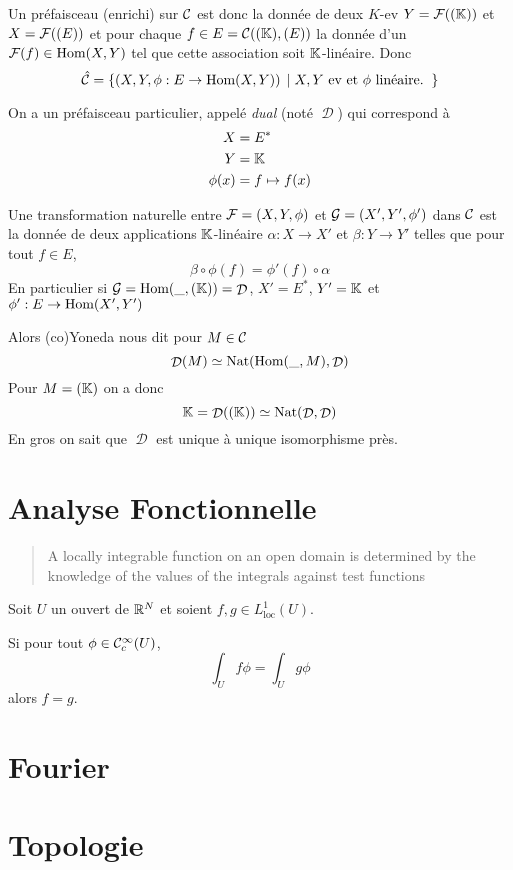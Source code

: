 \documentclass[12pt,makeidx, draft]{amsart}
\DeclareMathOperator\Nat{\text{Nat}}
\DeclareMathOperator\Dd{\mathcal{D}}
\begin{document}
Un préfaisceau (enrichi) sur $\mathcal{C}$ est donc la donnée de deux $K$-ev $Y = \mathcal{F}((\mathbb{K}))$ et $X=\mathcal{F}((E))$ et pour chaque $f \in E = \mathcal{C}((\mathbb{K}),(E))$ la donnée d'un $\mathcal{F}(f) \in \text{Hom}(X,Y)$ tel que cette association soit $\mathbb{K}$-linéaire. Donc
\[
\hat{\mathcal{C}} = \left\lbrace {\left(X,Y,\phi: E \to\text{Hom}(X,Y)\right)} \; \left| \; {X,Y \text{ ev  et }\phi\text{ linéaire. }} \right. \right\rbrace
\]

On a un préfaisceau particulier, appelé \textit{dual} (noté $\Dd$) qui correspond à 
\begin{align*}
X &= E^*\\
Y &= \mathbb{K}\\
\phi(x) &= f \mapsto f(x)
\end{align*}

Une transformation naturelle entre $\mathcal{F} = (X,Y,\phi)$ et $\mathcal{G} = (X',Y',\phi')$ dans $\mathcal{C}$ est la donnée de deux applications $\mathbb{K}$-linéaire $\alpha : X \to X'$ et $\beta : Y \to Y'$ telles que pour tout $f \in E$, 
\[
\beta \circ \phi(f) = \phi'(f) \circ \alpha
\]
En particulier si $\Gg = \Hom(\_,(\K)) = \Dd$, $X' = E^*$, $Y'=\mathbb{K}$ et $\phi' : E \to \text{Hom}(X',Y')$

Alors (co)Yoneda nous dit pour $M \in \mathcal{C}$
\begin{equation}
\Dd(M) \simeq \Nat(\Hom(\_,M),\Dd)
\end{equation}
Pour $M=(\mathbb{K})$ on a donc
\[
\K = \Dd((\K)) \simeq \Nat(\Dd,\Dd)
\]
En gros on sait que $\Dd$ est unique à unique isomorphisme près.
\section{Analyse Fonctionnelle}

\begin{quote}
A locally integrable function on an open domain is determined by the knowledge of the values of the integrals against test functions
\end{quote}

Soit $U$ un ouvert de $\mathbb{R}^N$ et soient $f,g \in L^1_{\text{loc}}(U)$. 

Si pour tout $\phi \in \mathcal{C}^\infty_c(U)$, 
\[
\int_U f\phi = \int_U g\phi
\]
alors $f=g$.


\section{Fourier}

\section{Topologie}
\end{document}
